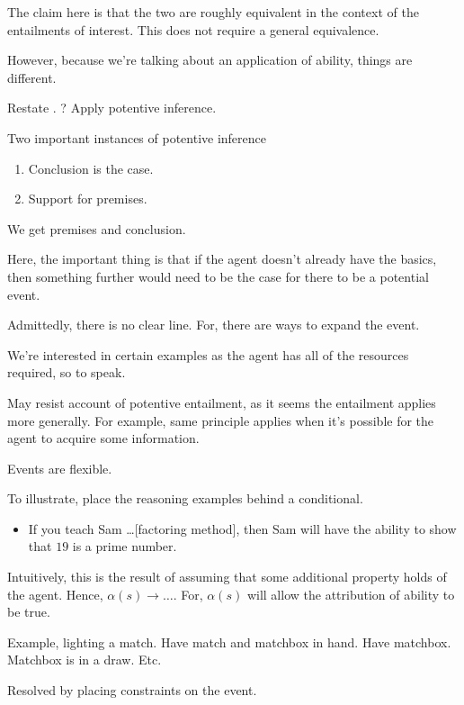 \begin{note}
  The claim here is that the two are roughly equivalent in the context of the entailments of interest.
  This does not require a general equivalence.

  However, because we're talking about an application of ability, things are different.
\end{note}

\begin{note}
  Restate \gen{}.{\color{red} ?}
  Apply potentive inference.

  Two important instances of potentive inference
  \begin{enumerate}
  \item Conclusion is the case.
  \item Support for premises.
  \end{enumerate}
\end{note}

\begin{note}
  We get premises and conclusion.

  Here, the important thing is that if the agent doesn't already have the basics, then something further would need to be the case for there to be a potential event.

  Admittedly, there is no clear line.
  For, there are ways to expand the event.

  We're interested in certain examples as the agent has all of the resources required, so to speak.

  May resist account of potentive entailment, as it seems the entailment applies more generally.
  For example, same principle applies when it's possible for the agent to acquire some information.

  Events are flexible.

  To illustrate, place the reasoning examples behind a conditional.
  \begin{itemize}
  \item If you teach Sam \dots [factoring method], then Sam will have the ability to show that \(19\) is a prime number.
  \end{itemize}
  Intuitively, this is the result of assuming that some additional property holds of the agent.
  Hence, \(\alpha(s) \rightarrow \dots\).
  For, \(\alpha(s)\) will allow the attribution of ability to be true.

  Example, lighting a match.
  Have match and matchbox in hand.
  Have matchbox.
  Matchbox is in a draw.
  Etc.

  Resolved by placing constraints on the event.
\end{note}

